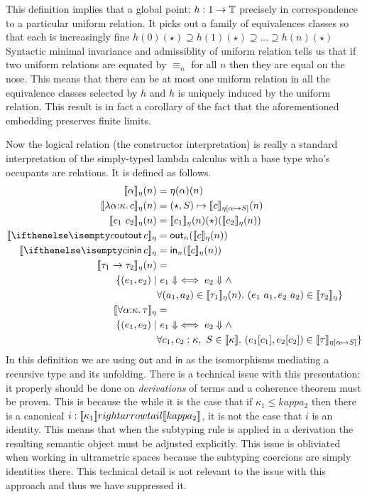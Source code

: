 This definition implies that a global point: $h : 1 \to \mathbb{T}$
precisely in correspondence to a particular uniform relation. It picks
out a family of equivalences classes so that each is increasingly fine
$h(0)(\star) \supseteq h(1)(\star) \supseteq ... \supseteq h(n)(\star)$
Syntactic minimal invariance and admissiblity of uniform relation
tells us that if two uniform relations are equated by $\equiv_n$ for
all $n$ then they are equal on the nose. This means that there can be
at most one uniform relation in all the equivalence classes selected
by $h$ and $h$ is uniquely induced by the uniform relation. This
result is in fact a corollary of the fact that the aforementioned
embedding preserves finite limits.

Now the logical relation (the constructor interpretation) is really a
standard interpretation of the simply-typed lambda calculus with a
base type who's occupants are relations. It is defined as follows.
\begin{align*}
  \den{\alpha}_\eta(n) &= \eta(\alpha)(n)\\
  \den{\lam{\alpha}{\kappa}{c}}_\eta(n) &= (\star, S) \mapsto \den{c}_{\eta[\alpha \mapsto S]}(n)\\
  \den{\ap{c_1}{c_2}}_\eta(n) &= \den{c_1}_\eta(n)(\star)(\den{c_2}_\eta(n))\\
  \den{\out{c}}_\eta &= \mathsf{out}_n(\den{c}_\eta(n))\\
  \den{\into{c}}_\eta &= \mathsf{in}_n(\den{c}_\eta(n))\\
  \den{\fn{\tau_1}{\tau_2}}_\eta(n) &=\\
  \{(e_1, e_2) \mid&\ e_1 \Downarrow \iff {e_2 \Downarrow} \AND \\
  & \forall (a_1, a_2) \in \den{\tau_1}_\eta(n). \ (\ap{e_1}{a_1}, \ap{e_2}{a_2}) \in \den{\tau_2}_\eta\}\\
  \den{\all{\alpha}{\kappa}{\tau}}_\eta &=\\
  \{(e_1, e_2) \mid&\ e_1 \Downarrow \iff {e_2 \Downarrow} \AND\\
  &\forall c_1, c_2 : \kappa,\ S \in \den{\kappa}.
    \ (\Ap{e_1}{c_1}, \Ap{e_2}{c_2}) \in \den{\tau}_{\eta[\alpha \mapsto S]}\}
\end{align*}
In this definition we are using $\mathsf{out}$ and $\mathsf{in}$ as
the isomorphisms mediating a recursive type and its unfolding. There
is a technical issue with this presentation: it properly should be
done on \emph{derivations} of terms and a coherence theorem must be
proven. This is because the while it is the case that if
$\kappa_1 \le kappa_2$ then there is a canonical
$i : \llbracket \kappa_1 \rrbracket rightarrowtail \llbracket kappa_2 \rrbracket$, it is not the case that $i$
is an identity. This means that when the subtyping rule is applied in
a derivation the resulting semantic object must be adjusted
explicitly. This issue is obliviated when working in ultrametric
spaces because the subtyping coercions are simply identities
there. This technical detail is not relevant to the issue with this
approach and thus we have suppressed it.

